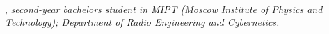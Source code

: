 
\

, \textit{second-year bachelors student in MIPT (Moscow Institute of Physics and Technology); Department of Radio Engineering and Cybernetics. }	\hfill {}



